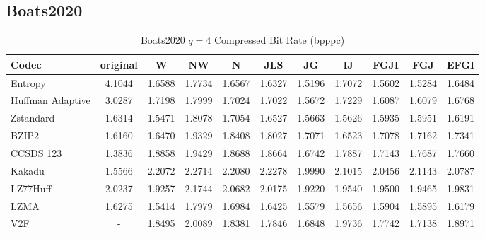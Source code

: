 \documentclass{article}
\begin{document}
\subsection{Boats2020}
\begin{table}[h!]
\centering
\caption{Boats2020 $q=4$ Compressed Bit Rate (bpppc)}
\begin{tabular}{|l|cccccccccc|}
\hline
Codec &  original &      W &     NW &      N &    JLS &     JG &     IJ &   FGJI &    FGJ &   EFGI \\
\hline
Entropy & 4.1044 & 1.6588 & 1.7734 & 1.6567 & 1.6327 & 1.5196 & 1.7072 & 1.5602 & 1.5284 & 1.6484 \\
\hline
Huffman Adaptive &    3.0287 & 1.7198 & 1.7999 & 1.7024 & 1.7022 & 1.5672 & 1.7229 & 1.6087 & 1.6079 & 1.6768 \\
Zstandard        &    1.6314 & 1.5471 & 1.8078 & 1.7054 & 1.6527 & 1.5663 & 1.5626 & 1.5935 & 1.5951 & 1.6191 \\
BZIP2            &    1.6160 & 1.6470 & 1.9329 & 1.8408 & 1.8027 & 1.7071 & 1.6523 & 1.7078 & 1.7162 & 1.7341 \\
CCSDS 123        &    1.3836 & 1.8858 & 1.9429 & 1.8688 & 1.8664 & 1.6742 & 1.7887 & 1.7143 & 1.7687 & 1.7660 \\
Kakadu           &    1.5566 & 2.2072 & 2.2714 & 2.2080 & 2.2278 & 1.9990 & 2.1015 & 2.0456 & 2.1143 & 2.0787 \\
LZ77Huff         &    2.0237 & 1.9257 & 2.1744 & 2.0682 & 2.0175 & 1.9220 & 1.9540 & 1.9500 & 1.9465 & 1.9831 \\
LZMA             &    1.6275 & 1.5414 & 1.7979 & 1.6984 & 1.6425 & 1.5579 & 1.5656 & 1.5904 & 1.5895 & 1.6179 \\
V2F              &   - & 1.8495 & 2.0089 & 1.8381 & 1.7846 & 1.6848 & 1.9736 & 1.7742 & 1.7138 & 1.8971 \\
\hline
\end{tabular}
\end{table}
\end{document}
